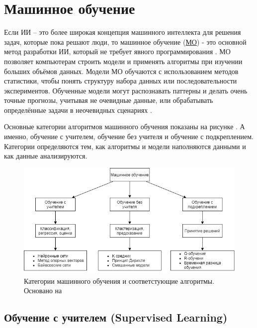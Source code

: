 \section{Машинное обучение} \label{ch1:ml}

Если ИИ – это более широкая концепция машинного интеллекта для решения задач, которые пока решают люди, то машинное обучение (\hyperref[acr:ml]{МО}) - это основной метод разработки ИИ, который не требует явного программирования \cite{Samuel-SomeStudies}. МО позволяет компьютерам строить модели и применять алгоритмы при изучении больших объёмов данных. Модели МО обучаются с использованием методов статистики, чтобы понять структуру набора данных или последовательности экспериментов. Обученные модели могут распознавать паттерны и делать очень точные прогнозы, учитывая не очевидные данные, или обрабатывать определённые задачи в неочевидных сценариях \cite{bishop06pattern}.

Основные категории алгоритмов машинного обучения показаны на рисунке . А именно, обучение с учителем, обучение без учителя и обучение с подкреплением.
Категории определяются тем, как алгоритмы и модели наполняются данными и как данные анализируются.

\begin{figure}[ht!]
    \center
    \includegraphics [scale=0.60] {my_folder/images/ch1/ML-categories.png}
    \caption{Категории машинного обучения и соответстующие алгоритмы. Основано на \cite{Sultan_2018}}
    \label{fig:ch1-ML-categories}
\end{figure}

\subsection{Обучение с учителем (Supervised Learning)}

